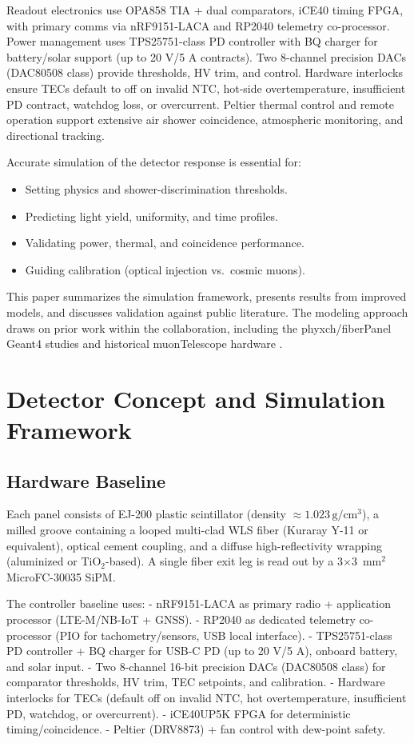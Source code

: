 \documentclass[11pt,a4paper]{article}
\begin{document}
Readout electronics use OPA858 TIA + dual comparators, iCE40 timing FPGA, with primary comms via nRF9151-LACA and RP2040 telemetry co-processor. Power management uses TPS25751-class PD controller with BQ charger for battery/solar support (up to 20 V/5 A contracts). Two 8-channel precision DACs (DAC80508 class) provide thresholds, HV trim, and control. Hardware interlocks ensure TECs default to off on invalid NTC, hot-side overtemperature, insufficient PD contract, watchdog loss, or overcurrent. Peltier thermal control and remote operation support extensive air shower coincidence, atmospheric monitoring, and directional tracking.

Accurate simulation of the detector response is essential for:
\begin{itemize}
  \item Setting physics and shower-discrimination thresholds.
  \item Predicting light yield, uniformity, and time profiles.
  \item Validating power, thermal, and coincidence performance.
  \item Guiding calibration (optical injection vs.\ cosmic muons).
\end{itemize}

This paper summarizes the simulation framework, presents results from improved models, and discusses validation against public literature. The modeling approach draws on prior work within the collaboration, including the phyxch/fiberPanel Geant4 studies \cite{phyxch-fiberpanel} and historical muonTelescope hardware \cite{scintpanel-cad}.

\section{Detector Concept and Simulation Framework}

\subsection{Hardware Baseline}
Each panel consists of EJ-200 plastic scintillator (density $\approx 1.023\,\mathrm{g/cm^3}$), a milled groove containing a looped multi-clad WLS fiber (Kuraray Y-11 or equivalent), optical cement coupling, and a diffuse high-reflectivity wrapping (aluminized or TiO$_2$-based). A single fiber exit leg is read out by a 3$\times$3~mm$^2$ MicroFC-30035 SiPM.

The controller baseline uses:
- nRF9151-LACA as primary radio + application processor (LTE-M/NB-IoT + GNSS).
- RP2040 as dedicated telemetry co-processor (PIO for tachometry/sensors, USB local interface).
- TPS25751-class PD controller + BQ charger for USB-C PD (up to 20 V/5 A), onboard battery, and solar input.
- Two 8-channel 16-bit precision DACs (DAC80508 class) for comparator thresholds, HV trim, TEC setpoints, and calibration.
- Hardware interlocks for TECs (default off on invalid NTC, hot overtemperature, insufficient PD, watchdog, or overcurrent).
- iCE40UP5K FPGA for deterministic timing/coincidence.
- Peltier (DRV8873) + fan control with dew-point safety.
\end{document}
